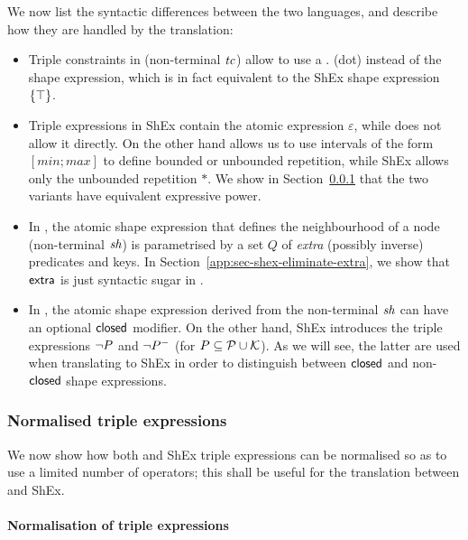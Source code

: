 We now list the syntactic differences between the two languages, and describe
how they are handled by the translation:
\begin{itemize}[\textbullet]
\item
  Triple constraints in \stshex (non-terminal $\mathit{tc}$) allow to use a $.$
  (dot) instead of the shape expression, which is in fact equivalent to the
  ShEx shape expression $\left\{ \top \right\}$.
\item
  Triple expressions in ShEx contain the atomic expression $\varepsilon$,
  while \stshex does not allow it directly.
  On the other hand \stshex allows us to use intervals of the form
  $[\mathit{min};\mathit{max}]$ to define bounded or unbounded repetition,
  while ShEx allows only the unbounded repetition $*$.
  We show in Section~\ref{app:sec-shex-syntax-triple-expr} that the two
  variants have equivalent expressive power.
\item
  In \stshex, the atomic shape expression that defines the neighbourhood of a
  node (non-terminal $\mathit{sh}$) is parametrised by a set $Q$ of \emph{extra}
  (possibly inverse) predicates and keys.
  In Section~\ref{app:sec-shex-eliminate-extra}, we show that $\mathsf{extra}$ is
  just syntactic sugar in \stshex.
\item
  In \stshex, the atomic shape expression derived from the non-terminal
  $\mathit{sh}$ can have an optional $\mathsf{closed}$ modifier.
  On the other hand, ShEx introduces the triple expressions $\neg P$ and
  $\neg{P^{-}}$ (for $P \subseteq \mathcal{P} \cup \mathcal{K}$).
  As we will see, the latter are used when translating \stshex to ShEx in
  order to distinguish between $\mathsf{closed}$ and non-$\mathsf{closed}$ \stshex
  shape expressions.
\end{itemize}


\subsubsection{Normalised triple expressions}
\label{app:sec-shex-syntax-triple-expr}

We now show how both \stshex and ShEx triple expressions can be normalised so as
to use a limited number of operators; this shall be useful for the translation
between \stshex and ShEx.


\paragraph{Normalisation of \stshex triple expressions}

